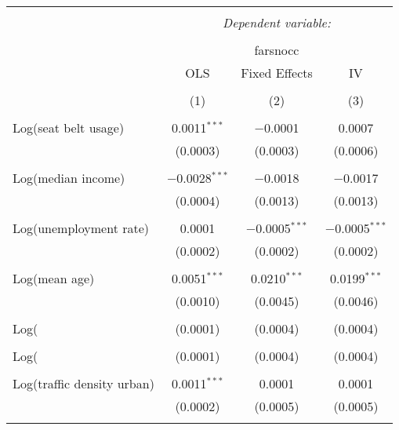 
\begin{table}[!htbp] \centering 
  \caption{} 
  \label{} 
\begin{tabular}{@{\extracolsep{5pt}}lccc} 
\\[-1.8ex]\hline 
\hline \\[-1.8ex] 
 & \multicolumn{3}{c}{\textit{Dependent variable:}} \\ 
\cline{2-4} 
\\[-1.8ex] & \multicolumn{3}{c}{farsnocc} \\ 
 & OLS & Fixed Effects & IV \\ 
\\[-1.8ex] & (1) & (2) & (3)\\ 
\hline \\[-1.8ex] 
 Log(seat belt usage) & 0.0011$^{***}$ & $-$0.0001 & 0.0007 \\ 
  & (0.0003) & (0.0003) & (0.0006) \\ 
  & & & \\ 
 Log(median income) & $-$0.0028$^{***}$ & $-$0.0018 & $-$0.0017 \\ 
  & (0.0004) & (0.0013) & (0.0013) \\ 
  & & & \\ 
 Log(unemployment rate) & 0.0001 & $-$0.0005$^{***}$ & $-$0.0005$^{***}$ \\ 
  & (0.0002) & (0.0002) & (0.0002) \\ 
  & & & \\ 
 Log(mean age) & 0.0051$^{***}$ & 0.0210$^{***}$ & 0.0199$^{***}$ \\ 
  & (0.0010) & (0.0045) & (0.0046) \\ 
  & & & \\ 
 Log(%
  & (0.0001) & (0.0004) & (0.0004) \\ 
  & & & \\ 
 Log(%
  & (0.0001) & (0.0004) & (0.0004) \\ 
  & & & \\ 
 Log(traffic density urban) & 0.0011$^{***}$ & 0.0001 & 0.0001 \\ 
  & (0.0002) & (0.0005) & (0.0005) \\ 
  & & & \\ 

\end{tabular}
\end{table}
